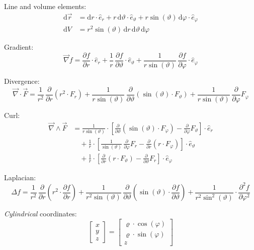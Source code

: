 \documentclass[fontsize=11pt,a4paper]{scrartcl}
\begin{document}
Line and volume elements:
\begin{align*}
	\mathrm{d}\vec r &= \mathrm{d}r\cdot\hat e_r + r\,\mathrm{d}\vartheta\cdot\hat e_\vartheta + r\sin(\vartheta)\,\mathrm{d}\varphi\cdot\hat e_\varphi\\
	\mathrm{d}V &= r^2\sin(\vartheta)\,\mathrm{d}r\,\mathrm{d}\vartheta\,\mathrm{d}\varphi
\end{align*}

Gradient:
\[
	\vec\nabla f = \frac{\partial f}{\partial r}\cdot\hat e_r + \frac{1}{r}\,\frac{\partial f}{\partial \vartheta}\cdot\hat e_\vartheta
	               + \frac{1}{r\sin(\vartheta)}\,\frac{\partial f}{\partial\varphi}\cdot\hat e_\varphi
\]

Divergence:
\[
	\vec\nabla\cdot\vec F = \frac{1}{r^2}\,\frac{\partial}{\partial r}(r^2\cdot F_r)
	                        + \frac{1}{r\sin(\vartheta)}\,\frac{\partial}{\partial\vartheta}\left(\sin(\vartheta)\cdot F_\vartheta\right)
	                        + \frac{1}{r\sin(\vartheta)}\,\frac{\partial}{\partial\varphi} F_\varphi
\]

Curl:
\begin{equation*}
\begin{split}
	\vec\nabla\wedge\vec F &= \frac{1}{r\sin(\vartheta)}\cdot\left[\frac{\partial}{\partial\vartheta}\left(\sin(\vartheta)\cdot F_\varphi\right)
	                    - \frac{\partial}{\partial\varphi}F_\vartheta\right]\cdot\hat e_r\\
	                 &\quad +\frac{1}{r}\cdot\left[\frac{1}{\sin(\vartheta)}\,\frac{\partial}{\partial\varphi}F_r
	                    - \frac{\partial}{\partial r}(r\cdot F_\varphi)\right]\cdot\hat e_\vartheta\\
	                 &\quad +\frac{1}{r}\cdot\left[\frac{\partial}{\partial r}(r\cdot F_\vartheta)-\frac{\partial}{\partial\vartheta}F_r\right]\cdot\hat e_\varphi
\end{split}
\end{equation*}

Laplacian:
\begin{equation*}
	\Delta f = \frac{1}{r^2}\,\frac{\partial}{\partial r}\left(r^2\cdot\frac{\partial f}{\partial r}\right)
	           + \frac{1}{r^2\sin(\vartheta)}\,\frac{\partial}{\partial\vartheta}\left(\sin(\vartheta)\cdot\frac{\partial f}{\partial\vartheta}\right)
	           + \frac{1}{r^2\sin^2(\vartheta)}\cdot\frac{\partial^2 f}{\partial\varphi^2}
\end{equation*}

\emph{Cylindrical} coordinates:
\[
	\begin{bmatrix}x\\ y\\ z\end{bmatrix} =
	\begin{bmatrix}\varrho\cdot\cos(\varphi)\\ \varrho\cdot\sin(\varphi)\\ z\end{bmatrix}
\]
\end{document}
